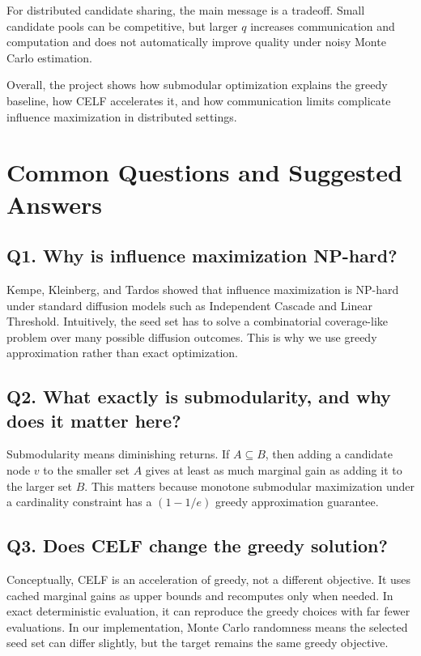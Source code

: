 \documentclass[10pt]{article}
\begin{document}
For distributed candidate sharing, the main message is a tradeoff. Small
candidate pools can be competitive, but larger \(q\) increases communication
and computation and does not automatically improve quality under noisy Monte
Carlo estimation.

Overall, the project shows how submodular optimization explains the greedy
baseline, how CELF accelerates it, and how communication limits complicate
influence maximization in distributed settings.

\section{Common Questions and Suggested Answers}

\subsection*{Q1. Why is influence maximization NP-hard?}

Kempe, Kleinberg, and Tardos showed that influence maximization is NP-hard
under standard diffusion models such as Independent Cascade and Linear
Threshold. Intuitively, the seed set has to solve a combinatorial coverage-like
problem over many possible diffusion outcomes. This is why we use greedy
approximation rather than exact optimization.

\subsection*{Q2. What exactly is submodularity, and why does it matter here?}

Submodularity means diminishing returns. If \(A\subseteq B\), then adding a
candidate node \(v\) to the smaller set \(A\) gives at least as much marginal
gain as adding it to the larger set \(B\). This matters because monotone
submodular maximization under a cardinality constraint has a \((1-1/e)\)
greedy approximation guarantee.

\subsection*{Q3. Does CELF change the greedy solution?}

Conceptually, CELF is an acceleration of greedy, not a different objective. It
uses cached marginal gains as upper bounds and recomputes only when needed. In
exact deterministic evaluation, it can reproduce the greedy choices with far
fewer evaluations. In our implementation, Monte Carlo randomness means the
selected seed set can differ slightly, but the target remains the same greedy
objective.
\end{document}
